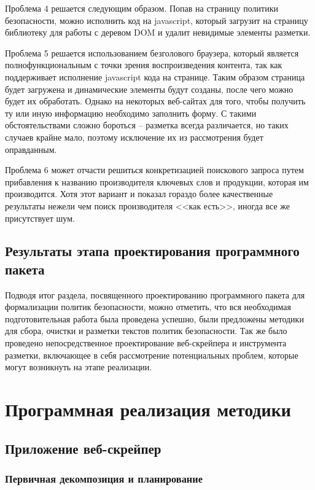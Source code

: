 \documentclass[../main]{subfiles}
\begin{document}
Проблема 4 решается следующим образом. Попав на страницу политики безопасности, можно исполнить код на javascript, который загрузит на страницу библиотеку для работы с деревом DOM и удалит невидимые элементы разметки.

Проблема 5 решается использованием безголового браузера, который является полнофункциональным с точки зрения воспроизведения контента, так как поддерживает исполнение javascript кода на странице. Таким образом страница будет загружена и динамические элементы будут созданы, после чего можно будет их обработать. Однако на некоторых веб-сайтах для того, чтобы получить ту или иную информацию необходимо заполнить форму. С такими обстоятельствами сложно бороться – разметка всегда различается, но таких случаев крайне мало, поэтому исключение их из рассмотрения будет оправданным.

Проблема 6 может отчасти решиться конкретизацией поискового запроса путем прибавления к названию производителя ключевых слов и продукции, которая им производится. Хотя этот вариант и показал гораздо более качественные результаты нежели чем поиск производителя <<как есть>>, иногда все же присутствует шум.

\subsection{Результаты этапа проектирования программного пакета}
Подводя итог раздела, посвященного проектированию программного пакета для формализации политик безопасности, можно отметить, что вся необходимая подготовительная работа была проведена успешно, были предложены методики для сбора, очистки и разметки текстов политик безопасности. Так же было проведено непосредственное проектирование веб-скрейпера и инструмента разметки, включающее в себя рассмотрение потенциальных проблем, которые могут возникнуть на этапе реализации.

\newpage
\section{Программная реализация методики}

\subsection{Приложение веб-скрейпер}

\subsubsection{Первичная декомпозиция и планирование}
\end{document}
